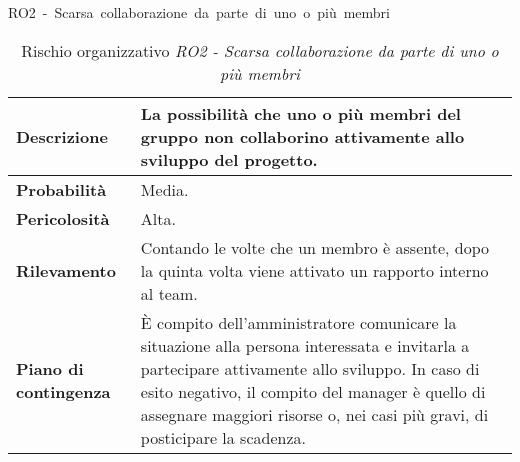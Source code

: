 \begin{table}[!h]
    \centering
    \hbox{RO2 - Scarsa collaborazione da parte di uno o più membri}
    \vspace{0.3cm}
	\begin{tabular}{|l|p{10cm}|} 
		\hline
		\textbf{Descrizione} & La possibilità che uno o più membri del gruppo non collaborino attivamente allo sviluppo del progetto. \\ 
        \hline
        \textbf{Probabilità} & Media. \\
        \hline
        \textbf{Pericolosità} & Alta. \\
        \hline
        \textbf{Rilevamento} & Contando le volte che un membro è assente, dopo la quinta volta viene attivato un rapporto interno al team.\\
        \hline
        \textbf{Piano di contingenza} & È compito dell'amministratore comunicare la situazione alla persona interessata e invitarla a partecipare attivamente allo sviluppo. In caso di esito negativo, il compito del manager è quello di assegnare maggiori risorse o, nei casi più gravi, di posticipare la scadenza.\\
		\hline
	\end{tabular}
    \caption{Rischio organizzativo \textit{RO2 - Scarsa collaborazione da parte di uno o più membri}}
    \label{table:4}
\end{table}



